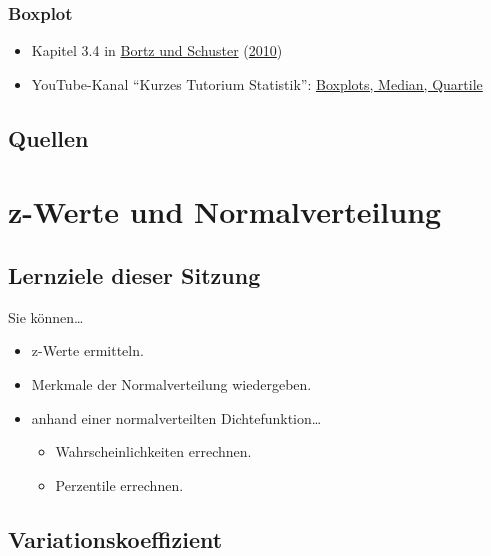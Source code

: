 \documentclass[
  ngerman,
]{article}
\providecommand{\tightlist}{%
  \setlength{\itemsep}{0pt}\setlength{\parskip}{0pt}}
\begin{document}
\hypertarget{boxplot-1}{%
\subsubsection{Boxplot}\label{boxplot-1}}

\begin{itemize}
\tightlist
\item
  Kapitel 3.4 in \protect\hyperlink{ref-bortz}{Bortz und Schuster} (\protect\hyperlink{ref-bortz}{2010})
\item
  YouTube-Kanal ``Kurzes Tutorium Statistik'': \href{https://www.youtube.com/watch?v=HsDeAoBOyS4}{Boxplots, Median, Quartile}
\end{itemize}

\hypertarget{quellen-1}{%
\subsection{Quellen}\label{quellen-1}}

\hypertarget{z-werte-und-normalverteilung}{%
\section{z-Werte und Normalverteilung}\label{z-werte-und-normalverteilung}}

\hypertarget{lernziele-dieser-sitzung-2}{%
\subsection{Lernziele dieser Sitzung}\label{lernziele-dieser-sitzung-2}}

Sie können\ldots{}

\begin{itemize}
\tightlist
\item
  z-Werte ermitteln.
\item
  Merkmale der Normalverteilung wiedergeben.
\item
  anhand einer normalverteilten Dichtefunktion\ldots{}

  \begin{itemize}
  \tightlist
  \item
    Wahrscheinlichkeiten errechnen.
  \item
    Perzentile errechnen.
  \end{itemize}
\end{itemize}

\hypertarget{variationskoeffizient}{%
\subsection{Variationskoeffizient}\label{variationskoeffizient}}
\end{document}
